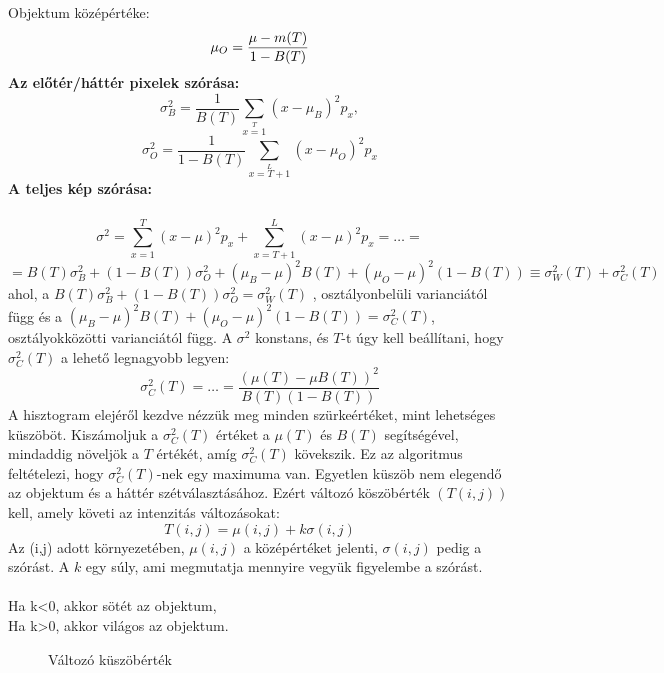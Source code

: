 \indent Objektum középértéke:
\begin{equation*}
\mu_O =\frac{\mu-m(T)}{1-B(T)}\\
\end{equation*}
\textbf{Az előtér/háttér pixelek szórása:}
$$\sigma^2_B=\frac{1}{B(T)}\sum\limits_{x=1}\limits^{T}(x-\mu_B)^2 p_x , $$
$$\sigma^2_O=\frac{1}{1-B(T)}\sum\limits_{x=T+1}\limits^{L}(x-\mu_O)^2 p_x $$
\textbf{A teljes kép szórása:}\\\\
$$\sigma^2=\sum_{x=1}^T(x-\mu)^2 p_x + \sum_{x=T+1}^L(x-\mu)^2 p_x=\dots= $$
$$=B(T)\sigma_B^2+(1-B(T))\sigma_O^2 + (\mu_B-\mu)^2B(T)+(\mu_O-\mu)^2(1-B(T)) \equiv \sigma^2_W(T)+\sigma^2_C(T)$$
ahol, a $B(T)\sigma_B^2+(1-B(T))\sigma_O^2 = \sigma^2_W(T)$ , osztályonbelüli varianciától függ és a $(\mu_B-\mu)^2B(T)+(\mu_O-\mu)^2(1-B(T)) = \sigma^2_C(T)$, osztályokközötti varianciától függ. A $\sigma^2$ konstans, és $T$-t úgy kell beállítani, hogy $\sigma_C^2(T)$ a lehető legnagyobb legyen:
$$\sigma^2_C(T)=\dots=\frac{(\mu(T)-\mu B(T))^2}{B(T)(1-B(T))}$$
A hisztogram elejéről kezdve nézzük meg minden szürkeértéket, mint lehetséges küszöböt. Kiszámoljuk a $\sigma^2_C(T)$ értéket a $\mu(T)$ és $B(T)$  segítségével, mindaddig növeljök a $T$ értékét, amíg $\sigma^2_C(T)$ kövekszik. Ez az algoritmus feltételezi, hogy $\sigma^2_C(T)$-nek egy maximuma van.
Egyetlen küszöb nem elegendő az objektum és a háttér szétválasztásához. Ezért változó köszöbérték $(T(i,j))$ kell, amely követi az intenzitás változásokat:
$$T(i,j)=\mu(i,j)+k\sigma(i,j)$$
Az (i,j) adott környezetében, $\mu(i,j)$ a középértéket jelenti, $\sigma(i,j)$ pedig a szórást. A $k$ egy súly, ami megmutatja mennyire vegyük figyelembe a szórást.\\\\
Ha k<0, akkor sötét az objektum,\\
Ha k>0, akkor világos az objektum.
\begin{figure}[ht]
\centering
{}
\caption{Változó küszöbérték} 
\label{fig: niblack}
\end{figure}

